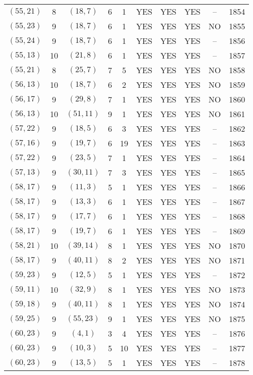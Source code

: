 \begin{longtable}{|c|c|c|c|c|c|c|c|c|c|}
$(55, 21)$ & 8 & $(18, 7)$ & 6 & 1 & YES & YES & YES & -- & 1854\\
$(55, 23)$ & 9 & $(18, 7)$ & 6 & 1 & YES & YES & YES & NO & 1855\\
$(55, 24)$ & 9 & $(18, 7)$ & 6 & 1 & YES & YES & YES & -- & 1856\\
$(55, 13)$ & 10 & $(21, 8)$ & 6 & 1 & YES & YES & YES & -- & 1857\\
$(55, 21)$ & 8 & $(25, 7)$ & 7 & 5 & YES & YES & YES & NO & 1858\\
$(56, 13)$ & 10 & $(18, 7)$ & 6 & 2 & YES & YES & YES & NO & 1859\\
$(56, 17)$ & 9 & $(29, 8)$ & 7 & 1 & YES & YES & YES & NO & 1860\\
$(56, 13)$ & 10 & $(51, 11)$ & 9 & 1 & YES & YES & YES & NO & 1861\\
$(57, 22)$ & 9 & $(18, 5)$ & 6 & 3 & YES & YES & YES & -- & 1862\\
$(57, 16)$ & 9 & $(19, 7)$ & 6 & 19 & YES & YES & YES & -- & 1863\\
$(57, 22)$ & 9 & $(23, 5)$ & 7 & 1 & YES & YES & YES & -- & 1864\\
$(57, 13)$ & 9 & $(30, 11)$ & 7 & 3 & YES & YES & YES & -- & 1865\\
$(58, 17)$ & 9 & $(11, 3)$ & 5 & 1 & YES & YES & YES & -- & 1866\\
$(58, 17)$ & 9 & $(13, 3)$ & 6 & 1 & YES & YES & YES & -- & 1867\\
$(58, 17)$ & 9 & $(17, 7)$ & 6 & 1 & YES & YES & YES & -- & 1868\\
$(58, 17)$ & 9 & $(19, 7)$ & 6 & 1 & YES & YES & YES & -- & 1869\\
$(58, 21)$ & 10 & $(39, 14)$ & 8 & 1 & YES & YES & YES & NO & 1870\\
$(58, 17)$ & 9 & $(40, 11)$ & 8 & 2 & YES & YES & YES & NO & 1871\\
$(59, 23)$ & 9 & $(12, 5)$ & 5 & 1 & YES & YES & YES & -- & 1872\\
$(59, 11)$ & 10 & $(32, 9)$ & 8 & 1 & YES & YES & YES & NO & 1873\\
$(59, 18)$ & 9 & $(40, 11)$ & 8 & 1 & YES & YES & YES & NO & 1874\\
$(59, 25)$ & 9 & $(55, 23)$ & 9 & 1 & YES & YES & YES & NO & 1875\\
$(60, 23)$ & 9 & $(4, 1)$ & 3 & 4 & YES & YES & YES & -- & 1876\\
$(60, 23)$ & 9 & $(10, 3)$ & 5 & 10 & YES & YES & YES & -- & 1877\\
$(60, 23)$ & 9 & $(13, 5)$ & 5 & 1 & YES & YES & YES & -- & 1878\\

\end{longtable}
